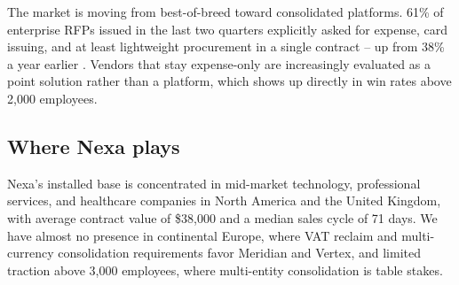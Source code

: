 \begin{tcolorbox}[infobox, title={\faChartBar\ Category shift to note}]
The market is moving from best-of-breed toward consolidated platforms. 61\% of enterprise RFPs
issued in the last two quarters explicitly asked for expense, card issuing, and at least
lightweight procurement in a single contract -- up from 38\% a year earlier
\cite{almanac2026procurement}. Vendors that stay expense-only are increasingly evaluated as a
point solution rather than a platform, which shows up directly in win rates above 2,000
employees.
\end{tcolorbox}

\subsection{Where Nexa plays}

Nexa's installed base is concentrated in mid-market technology, professional services, and
healthcare companies in North America and the United Kingdom, with average contract value of
\$38,000 and a median sales cycle of 71 days. We have almost no presence in continental Europe,
where VAT reclaim and multi-currency consolidation requirements favor Meridian and Vertex, and
limited traction above 3,000 employees, where multi-entity consolidation is table stakes.
